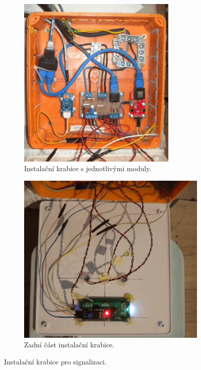 \begin{figure}[H]
\centering
\begin{subfigure}{.5\textwidth}
  \centering
  \includegraphics[width=0.835\textwidth]{images/krb/instalacni-krabice-vnitrek-krb.png}
  \caption{Instalační krabice s jednotlivými moduly.}
  \label{fig:instalacni-krabice-vnitrek-krb}
\end{subfigure}%
\begin{subfigure}{.5\textwidth}
  \centering
  \includegraphics[width=\textwidth]{images/krb/zadni-cast-krytu-vika-instalacni-krabice-krb.png}
  \caption{Zadní část instalační krabice.}
  \label{fig:zadni-cast-krytu-vika-instalacni-krabice-krb}
\end{subfigure}
\caption{Instalační krabice pro signalizaci.}
\label{fig:instalacni-krabice}
\end{figure}



